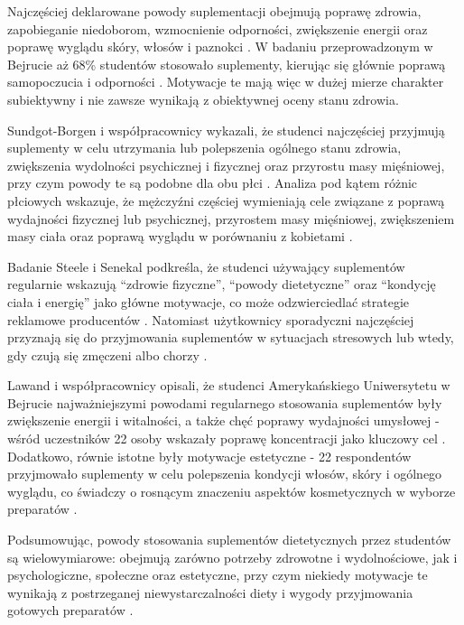 Najczęściej deklarowane powody suplementacji obejmują poprawę zdrowia, zapobieganie niedoborom, wzmocnienie odporności, zwiększenie energii oraz poprawę wyglądu skóry, włosów i paznokci \cite{knowledge-and-use,pharmacist-knowledge-and-use}. W badaniu przeprowadzonym w Bejrucie aż 68\% studentów stosowało suplementy, kierując się głównie poprawą samopoczucia i odporności \cite{pharmacist-knowledge-and-use}. Motywacje te mają więc w dużej mierze charakter subiektywny i nie zawsze wynikają z obiektywnej oceny stanu zdrowia.

Sundgot‐Borgen i współpracownicy wykazali, że studenci najczęściej przyjmują suplementy w celu utrzymania lub polepszenia ogólnego stanu zdrowia, zwiększenia wydolności psychicznej i fizycznej oraz przyrostu masy mięśniowej, przy czym powody te są podobne dla obu płci \cite{sundgot2022explanations}. Analiza pod kątem różnic płciowych wskazuje, że mężczyźni częściej wymieniają cele związane z poprawą wydajności fizycznej lub psychicznej, przyrostem masy mięśniowej, zwiększeniem masy ciała oraz poprawą wyglądu w porównaniu z kobietami \cite{sundgot2022explanations}.

Badanie Steele i Senekal podkreśla, że studenci używający suplementów regularnie wskazują \enquote{zdrowie fizyczne}, \enquote{powody dietetyczne} oraz \enquote{kondycję ciała i energię} jako główne motywacje, co może odzwierciedlać strategie reklamowe producentów \cite{steele2005dietary}. Natomiast użytkownicy sporadyczni najczęściej przyznają się do przyjmowania suplementów w sytuacjach stresowych lub wtedy, gdy czują się zmęczeni albo chorzy \cite{steele2005dietary}.

Lawand i współpracownicy opisali, że studenci Amerykańskiego Uniwersytetu w Bejrucie najważniejszymi powodami regularnego stosowania suplementów były zwiększenie energii i witalności, a także chęć poprawy wydajności umysłowej - wśród uczestników 22 osoby wskazały poprawę koncentracji jako kluczowy cel \cite{lawand2023assessment}. Dodatkowo, równie istotne były motywacje estetyczne - 22 respondentów przyjmowało suplementy w celu polepszenia kondycji włosów, skóry i ogólnego wyglądu, co świadczy o rosnącym znaczeniu aspektów kosmetycznych w wyborze preparatów \cite{lawand2023assessment}.

Podsumowując, powody stosowania suplementów dietetycznych przez studentów są wielowymiarowe: obejmują zarówno potrzeby zdrowotne i wydolnościowe, jak i psychologiczne, społeczne oraz estetyczne, przy czym niekiedy motywacje te wynikają z postrzeganej niewystarczalności diety i wygody przyjmowania gotowych preparatów \cite{steele2005dietary,sundgot2022explanations,lawand2023assessment}.


